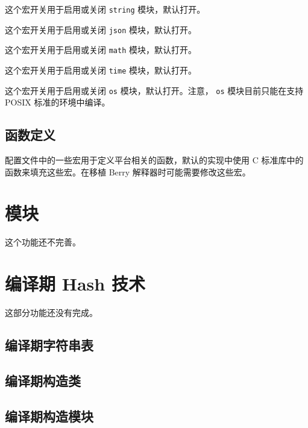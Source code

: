 这个宏开关用于启用或关闭 \texttt{string} 模块，默认打开。


这个宏开关用于启用或关闭 \texttt{json} 模块，默认打开。


这个宏开关用于启用或关闭 \texttt{math} 模块，默认打开。


这个宏开关用于启用或关闭 \texttt{time} 模块，默认打开。


这个宏开关用于启用或关闭 \texttt{os} 模块，默认打开。注意， \texttt{os} 模块目前只能在支持 POSIX 标准的环境中编译。

\subsection{函数定义}

配置文件中的一些宏用于定义平台相关的函数，默认的实现中使用 C 标准库中的函数来填充这些宏。在移植 Berry 解释器时可能需要修改这些宏。











\section{模块}

这个功能还不完善。

\section{编译期 Hash 技术}

这部分功能还没有完成。

\subsection{编译期字符串表}

\subsection{编译期构造类}

\subsection{编译期构造模块}
